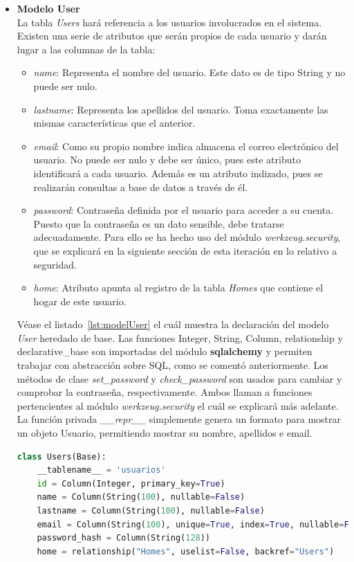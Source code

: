 \begin{itemize}
\item \textbf{Modelo User}\\
La tabla \textit{Users} hará referencia a los usuarios involucrados en el sistema. Existen una serie de atributos que serán propios de cada usuario y darán lugar a las columnas de la tabla:
\begin{itemize}
\item \textit{name}: Representa el nombre del usuario. Este dato es de tipo String y no puede ser nulo.
\item \textit{lastname}: Representa los apellidos del usuario. Toma exactamente las mismas características que el anterior.
\item \textit{email}: Como su propio nombre indica almacena el correo electrónico del usuario. No puede ser nulo y debe ser único, pues este atributo identificará a cada usuario. Además es un atributo indizado, pues se realizarán consultas a base de datos a través de él.
\item \textit{password}: Contraseña definida por el usuario para acceder a su cuenta. Puesto que la contraseña es un dato sensible, debe tratarse adecuadamente. Para ello se ha hecho uso del módulo \textit{werkzeug.security}, que se explicará en la siguiente sección de esta iteración en lo relativo a seguridad.
\item \textit{home}: Atributo apunta al registro de la tabla \textit{Homes} que contiene el hogar de este usuario.
\end{itemize}
Véase el listado~\ref{lst:modelUser} el cuál muestra la declaración del modelo \textit{User} heredado de base. Las funciones Integer, String, Column, relationship y declarative\_base son importadas del módulo \textbf{sqlalchemy} y permiten trabajar con abstracción sobre SQL, como se comentó anteriormente. Los métodos de clase \textit{set\_password} y \textit{check\_password} son usados para cambiar y comprobar la contraseña, respectivamente. Ambos llaman a funciones pertencientes al módulo \textit{werkzeug.security} el cuál se explicará más adelante. La función privada \textit{\_\_repr\_\_} simplemente genera un formato para mostrar un objeto Usuario, permitiendo mostrar su nombre, apellidos e email.
\begin{lstlisting}[language=Python,float=ht,caption={Modelo \textit{User}},label={lst:modelUser}]
class Users(Base):
    __tablename__ = 'usuarios'
    id = Column(Integer, primary_key=True)
    name = Column(String(100), nullable=False)
    lastname = Column(String(100), nullable=False)
    email = Column(String(100), unique=True, index=True, nullable=False)
    password_hash = Column(String(128))
    home = relationship("Homes", uselist=False, backref="Users")


\end{lstlisting}
\end{itemize}
